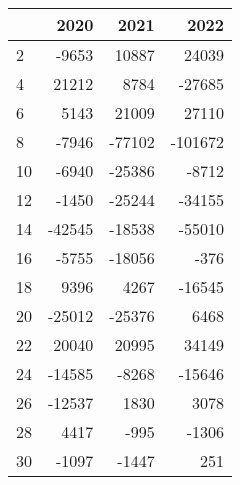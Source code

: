 \begin{tabular}{lrrr}
\toprule
{} &   2020 &   2021 &    2022 \\
\midrule
2  &  -9653 &  10887 &   24039 \\
4  &  21212 &   8784 &  -27685 \\
6  &   5143 &  21009 &   27110 \\
8  &  -7946 & -77102 & -101672 \\
10 &  -6940 & -25386 &   -8712 \\
12 &  -1450 & -25244 &  -34155 \\
14 & -42545 & -18538 &  -55010 \\
16 &  -5755 & -18056 &    -376 \\
18 &   9396 &   4267 &  -16545 \\
20 & -25012 & -25376 &    6468 \\
22 &  20040 &  20995 &   34149 \\
24 & -14585 &  -8268 &  -15646 \\
26 & -12537 &   1830 &    3078 \\
28 &   4417 &   -995 &   -1306 \\
30 &  -1097 &  -1447 &     251 \\
\bottomrule
\end{tabular}
